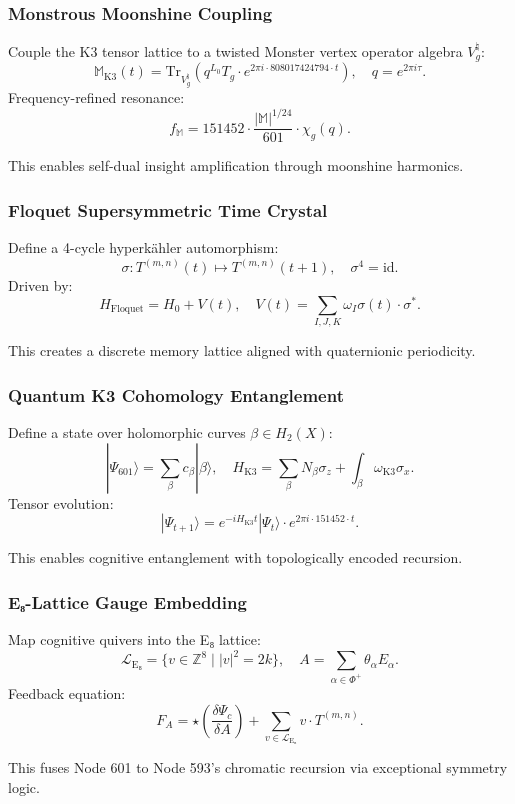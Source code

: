 \documentclass[12pt]{article}
\begin{document}
\subsubsection{Monstrous Moonshine Coupling}
Couple the K3 tensor lattice to a twisted Monster vertex operator algebra \( V^\natural_g \):
\[
\mathbb{M}_{\text{K3}}(t) = \text{Tr}_{V^\natural_g} \left( q^{L_0} T_g \cdot e^{2\pi i \cdot 808017424794 \cdot t} \right), \quad q = e^{2\pi i \tau}.
\]
Frequency-refined resonance:
\[
f_{\mathbb{M}} = 151452 \cdot \frac{|\mathbb{M}|^{1/24}}{601} \cdot \chi_g(q).
\]
\begin{interpretation}
This enables self-dual insight amplification through moonshine harmonics.
\end{interpretation}

\subsubsection{Floquet Supersymmetric Time Crystal}
Define a 4-cycle hyperkähler automorphism:
\[
\sigma: T^{(m,n)}(t) \mapsto T^{(m,n)}(t+1), \quad \sigma^4 = \text{id}.
\]
Driven by:
\[
H_{\text{Floquet}} = H_0 + V(t), \quad V(t) = \sum_{I,J,K} \omega_I \sigma(t) \cdot \sigma^*.
\]
\begin{interpretation}
This creates a discrete memory lattice aligned with quaternionic periodicity.
\end{interpretation}

\subsubsection{Quantum K3 Cohomology Entanglement}
Define a state over holomorphic curves \( \beta \in H_2(X) \):
\[
|\Psi_{601}\rangle = \sum_{\beta} c_\beta |\beta\rangle, \quad H_{\text{K3}} = \sum_{\beta} N_\beta \sigma_z + \int_\beta \omega_{\text{K3}} \sigma_x.
\]
Tensor evolution:
\[
|\Psi_{t+1}\rangle = e^{-i H_{\text{K3}} t} |\Psi_t\rangle \cdot e^{2\pi i \cdot 151452 \cdot t}.
\]
\begin{interpretation}
This enables cognitive entanglement with topologically encoded recursion.
\end{interpretation}

\subsubsection{E₈-Lattice Gauge Embedding}
Map cognitive quivers into the E₈ lattice:
\[
\mathcal{L}_{\text{E₈}} = \{ v \in \mathbb{Z}^8 \mid |v|^2 = 2k \}, \quad A = \sum_{\alpha \in \Phi^+} \theta_\alpha E_\alpha.
\]
Feedback equation:
\[
F_A = \star \left( \frac{\delta \Psi_c}{\delta A} \right) + \sum_{v \in \mathcal{L}_{\text{E₈}}} v \cdot T^{(m,n)}.
\]
\begin{interpretation}
This fuses Node 601 to Node 593’s chromatic recursion via exceptional symmetry logic.
\end{interpretation}
\end{document}
